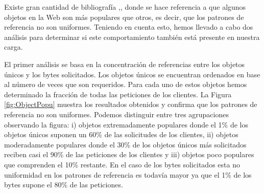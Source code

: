 \documentclass[twocolumn]{Jornadas}
\begin{document}
Existe gran cantidad de bibliografía \cite{mahanti},\cite{Breslau},\cite{arlitt2} donde se hace referencia a que algunos objetos en la Web son más populares que otros, es decir, que los patrones de referencia no son uniformes. Teniendo en cuenta esto, hemos llevado a cabo dos análisis para determinar si este comportamiento también está presente en nuestra carga.

El primer análisis se basa en la concentración de referencias entre los objetos únicos y los bytes solicitados. Los objetos únicos se encuentran ordenados en base al número de veces que son requeridos. Para cada uno de estos objetos hemos determinado la fracción de todas las peticiones de los clientes. La Figura \ref{fig:ObjectPopu} muestra los resultados obtenidos y confirma que los patrones de referencia no son uniformes. Podemos distinguir entre tres agrupaciones observando la figura: i) objetos extremadamente populares donde el 1\% de los objetos únicos suponen un 60\% de las solicitudes de los clientes, ii) objetos moderadamente populares donde el 30\% de los objetos únicos más solicitados reciben casi el 90\% de las peticiones de los clientes y iii) objetos poco populares que comprenden el 10\% restante. En el caso de los bytes solicitados esta no uniformidad en los patrones de referencia es todavía mayor ya que el 1\% de los bytes supone el 80\% de las peticiones.
\end{document}
